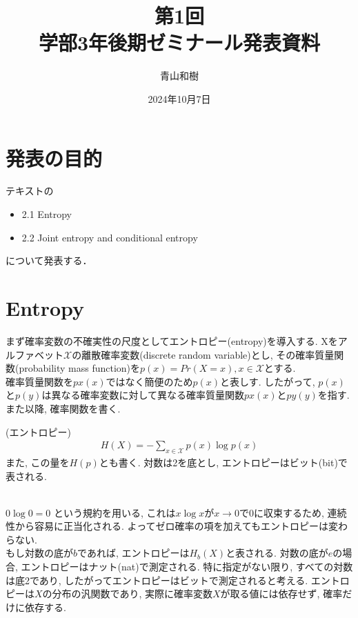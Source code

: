 \documentclass[a4j]{jsarticle}
\title{第1回\\学部3年後期ゼミナール発表資料}
\author{青山和樹}
\date{2024年10月7日}
\begin{document}
\maketitle

\section*{発表の目的}
テキスト\cite{text}の
\begin{itemize}
	\item 2.1 Entropy
	\item 2.2 Joint entropy and conditional entropy
\end{itemize}
について発表する．


\tableofcontents

\clearpage


\section{Entropy}

まず確率変数の不確実性の尺度としてエントロピー(entropy)を導入する. Xをアルファベット$\mathcal{X}$の離散確率変数(discrete random variable)とし, その確率質量関数(probability mass function)を$p(x) = Pr(X = x), x \in \mathcal{X}$とする.\\

 確率質量関数を$px(x)$ではなく簡便のため$p(x)$と表しす. したがって, $p(x)$と$p(y)$は異なる確率変数に対して異なる確率質量関数$px(x)$と$py(y)$を指す. また以降, 確率関数を書く. \\

\begin{itembox}[l]{ (エントロピー)}
	\begin{align}
		H(X) = - \sum_{x \in \mathcal{X}} p(x) \log p(x)
	\end{align}
	また, この量を$H(p)$とも書く. 対数は2を底とし, エントロピーはビット(bit)で表される.
\end{itembox}\\


 $0 \log 0 = 0$ という規約を用いる, これは$x \log x$が$x \rightarrow 0$で0に収束するため, 連続性から容易に正当化される. よってゼロ確率の項を加えてもエントロピーは変わらない.\\

もし対数の底が$b$であれば, エントロピーは$H_b(X)$と表される. 対数の底が$e$の場合, エントロピーはナット(nat)で測定される. 特に指定がない限り, すべての対数は底2であり, したがってエントロピーはビットで測定されると考える. エントロピーは$X$の分布の汎関数であり, 実際に確率変数$X$が取る値には依存せず, 確率だけに依存する.\\
\end{document}
